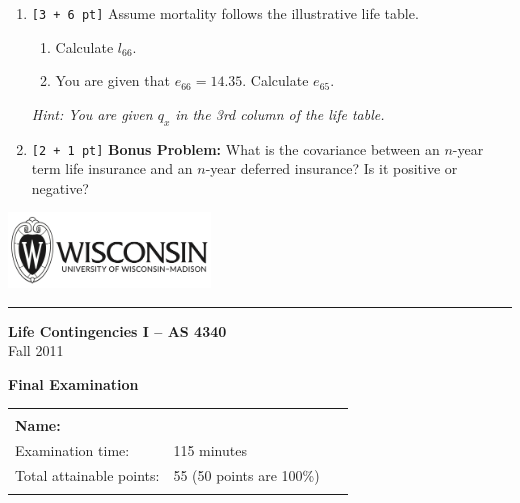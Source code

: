 \documentclass[11pt,fleqn,oneside]{book}
\begin{document}
\begin{enumerate}

\item {\tt [3 + 6 pt]} Assume mortality follows the illustrative life table.
\begin{enumerate}
\item Calculate $l_{66}$.
\item You are given that $e_{66} = 14.35$. Calculate $e_{65}$.
\end{enumerate}
{\small \it Hint: You are given $q_x$ in the 3rd column of the life table.}


\item {\tt [2 + 1 pt]} \textbf{Bonus Problem:} 
What is the covariance between an $n$-year term life insurance and an $n$-year deferred insurance? Is it positive or negative?

\end{enumerate}


\newpage

\thispagestyle{empty}
\setcounter{page}{1}


\thispagestyle{empty}

\includegraphics[height=2cm]{Graphs/wisc.png} 

\noindent \rule{\textwidth}{1.5pt}
    \begin{flushright}
    \textbf{\large Life Contingencies I -- AS 4340}\\  	
       {\large Fall 2011}\\
    \end{flushright}
\vspace{-1cm}

{\huge \textbf{Final Examination}}

\vspace{2cm}
{\large
\begin{center}
\begin{tabular}{|| l l ||}
\hline
\hline
& \\
\textbf{Name:} & \underline{$\;\;\;\;\;\;\;\;\;\;\;\;\;\;\;\;\;\;\;\;\;\;\;\;\;\;\;\;\;\;\;\;\;\;\;\;\;\;\;\;\;\;\;$} \\
Examination time: & 115 minutes \\
Total attainable points: & 55 (50 points are 100\%) \\
 & \\
\hline
\hline
\end{tabular}\\
\end{center}
$\;\;\;\;\;\;\;\;\;\;\;\;\;\;\;\;\;$
}
\end{document}
